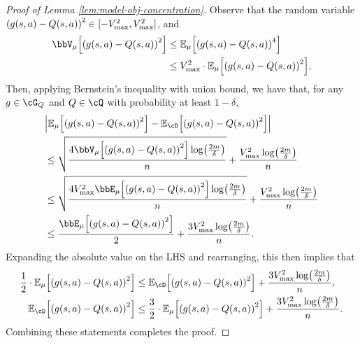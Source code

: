 \begin{proof}[Proof of Lemma \ref{lem:model-obj-concentration}]
  Observe that the random variable $\rbr*{g(s,a)-Q(s,a)}^2 \in [-\Vmax^2, \Vmax^2]$,
  and
  \begin{align}
    \bbV_\data\sbr*{\rbr*{g(s,a)-Q(s,a)}^2}
    & \le \En_\data\sbr*{\rbr*{g(s,a)-Q(s,a)}^4}
    \\
    & \le \Vmax^2\cdot \En_\data\sbr*{\rbr*{g(s,a)-Q(s,a)}^2}.
  \end{align}
  Then, applying Bernstein's inequality with union bound, 
  we have that, for any $g \in \cG_Q$ and $Q \in \cQ$ with probability at least $1-\delta$,
  \begin{align}
    &\abr*{ \En_{\data}\sbr*{\rbr*{g(s,a) - Q(s,a)}^2 }- \En_{\cD}\sbr*{\rbr*{g(s,a) - Q(s,a)}^2}}  
    \\
    & \le \sqrt{\frac{4\bbV_\data \sbr*{\rbr*{g(s,a) - Q(s,a)}^2}\log\rbr*{\frac{2m}{\delta}}}{n}}
    + \frac{\Vmax^2 \log\rbr*{\frac{2m}{\delta}}}{n}
    \\
    & \le  \sqrt{\frac{4\Vmax^{2}\bbE_\data \sbr*{\rbr*{g(s,a) - Q(s,a)}^2}\log\rbr*{\frac{2m}{\delta}}}{n}}
    + \frac{\Vmax^2 \log\rbr*{\frac{2m}{\delta}}}{n}
    \\
    & \le \frac{\bbE_\data \sbr*{\rbr*{g(s,a) - Q(s,a)}^2}}{2} 
    + \frac{3\Vmax^2\log\rbr*{\frac{2m}{\delta}}}{n}.
  \end{align}
  Expanding the absolute value on the LHS and rearranging, this then implies that
  \begin{align}
     \frac{1}{2} \cdot\En_{\data}\sbr*{\rbr*{g(s,a) - Q(s,a)}^2 } 
     & \le \En_{\cD}\sbr*{\rbr*{g(s,a) - Q(s,a)}^2}
     +  \frac{3\Vmax^2\log\rbr*{\frac{2m}{\delta}}}{n},
     \\
     \En_{\cD}\sbr*{\rbr*{g(s,a) - Q(s,a)}^2 } 
     & \le \frac{3}{2} \cdot\En_{\data}\sbr*{\rbr*{g(s,a) - Q(s,a)}^2}
     +  \frac{3\Vmax^2\log\rbr*{\frac{2m}{\delta}}}{n}. 
  \end{align}
  Combining these statements completes the proof. 
\end{proof}
